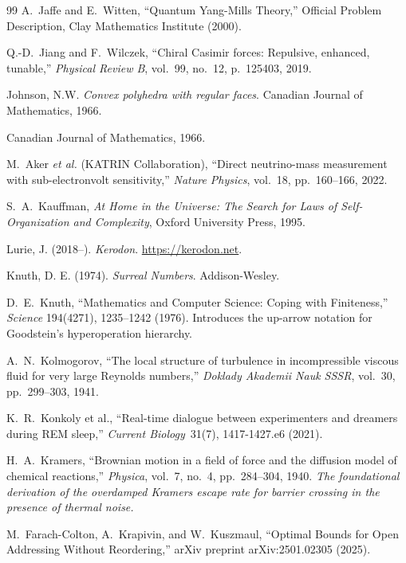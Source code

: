 \documentclass[12pt,oneside]{book}
\theoremstyle{principia}
\theoremstyle{definition}
\theoremstyle{remark}
\begin{document}
\begin{thebibliography}{99}
A.~Jaffe and E.~Witten,
``Quantum Yang-Mills Theory,''
Official Problem Description, Clay Mathematics Institute (2000).

Q.-D.~Jiang and F.~Wilczek,
``Chiral Casimir forces: Repulsive, enhanced, tunable,''
\emph{Physical Review B}, vol.~99, no.~12, p.~125403, 2019.

Johnson, N.W.
\newblock \emph{Convex polyhedra with regular faces}.
\newblock Canadian Journal of Mathematics, 1966.

\newblock Canadian Journal of Mathematics, 1966.

M.~Aker \emph{et al.} (KATRIN Collaboration), ``Direct neutrino-mass measurement with sub-electronvolt sensitivity,'' \emph{Nature Physics}, vol.~18, pp.~160--166, 2022.

S.~A.~Kauffman,
\emph{At Home in the Universe: The Search for Laws of Self-Organization and Complexity},
Oxford University Press, 1995.

Lurie, J. (2018--). \emph{Kerodon}. \url{https://kerodon.net}.

Knuth, D. E. (1974). \emph{Surreal Numbers}. Addison-Wesley.

D.~E.~Knuth,
``Mathematics and Computer Science: Coping with Finiteness,''
\emph{Science} 194(4271), 1235--1242 (1976).
Introduces the up-arrow notation for Goodstein's hyperoperation hierarchy.

A.~N.~Kolmogorov,
``The local structure of turbulence in incompressible viscous fluid for very large Reynolds numbers,''
\emph{Doklady Akademii Nauk SSSR}, vol.~30, pp.~299--303, 1941.

K.~R.~Konkoly et al., ``Real-time dialogue between experimenters and dreamers during REM sleep,'' \emph{Current Biology}\ 31(7), 1417-1427.e6 (2021).

H.~A.~Kramers,
``Brownian motion in a field of force and the diffusion model of chemical reactions,''
\emph{Physica}, vol.~7, no.~4, pp.~284--304, 1940.
\textit{The foundational derivation of the overdamped Kramers escape rate for barrier crossing in the presence of thermal noise.}

M.~Farach-Colton, A.~Krapivin, and W.~Kuszmaul,
``Optimal Bounds for Open Addressing Without Reordering,''
arXiv preprint arXiv:2501.02305 (2025).


\end{thebibliography}
\end{document}
